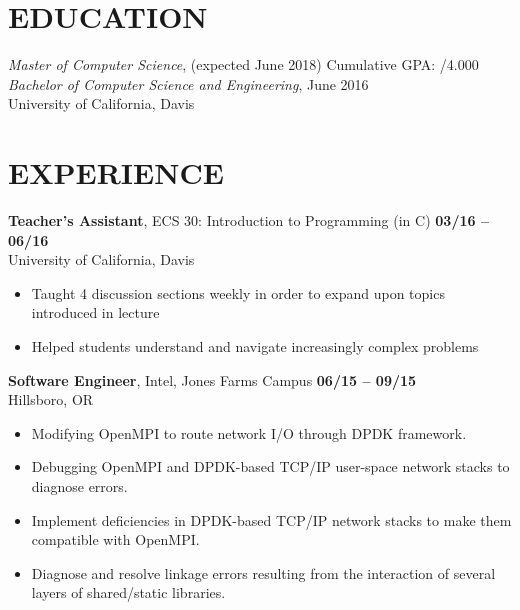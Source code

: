 \documentclass[10pt, letterpaper]{res}
\begin{document}
\address{jmmcgee@ucdavis.edu | (323) 557-8647}

\begin{resume}


\section{EDUCATION}
    {\sl Master of Computer Science}, (expected June 2018) \hfill  Cumulative GPA: /4.000 \\
    {\sl Bachelor of Computer Science and Engineering}, June 2016 \\
    University of California, Davis


\section{EXPERIENCE}
    
    {\bf Teacher's Assistant}, ECS 30: Introduction to Programming (in C) \hfill {\bf 03/16 -- 06/16} \\
	University of California, Davis
    \begin{itemize} \itemsep -2pt
        \item Taught 4 discussion sections weekly in order to expand upon topics introduced in lecture
        \item Helped students understand and navigate increasingly complex problems
    \end{itemize}

    {\bf Software Engineer}, Intel, Jones Farms Campus \hfill {\bf 06/15 -- 09/15} \\
    Hillsboro, OR
    \begin{itemize}[noitemsep]	 
        \item Modifying OpenMPI to route network I/O through DPDK framework.
        \item Debugging OpenMPI and DPDK-based TCP/IP user-space network stacks to diagnose errors.
        \item Implement deficiencies in DPDK-based TCP/IP network stacks to make them compatible with OpenMPI.
        \item Diagnose and resolve linkage errors resulting from the interaction of several layers of shared/static libraries.
    \end{itemize}


\end{resume}
\end{document}
